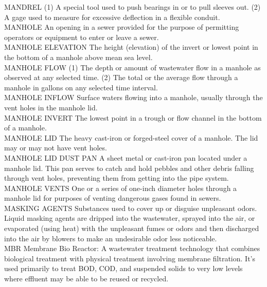 MANDREL
(1) A special tool used to push bearings in or to pull sleeves out. (2) A gage used to measure for excessive deflection in a flexible conduit. 
\vspace{0.3cm}\\
MANHOLE
An opening in a sewer provided for the purpose of permitting operators or equipment to enter or leave a sewer. 
\vspace{0.3cm}\\
MANHOLE ELEVATION
The height (elevation) of the invert or lowest point in the bottom of a manhole above mean sea level. 
\vspace{0.3cm}\\
MANHOLE FLOW
(1) The depth or amount of wastewater flow in a manhole as observed at any selected time. (2) The total or the average flow through a manhole in gallons on any selected time interval.
\vspace{0.3cm}\\
MANHOLE INFLOW
Surface waters flowing into a manhole, usually through the vent holes in the manhole lid. 
\vspace{0.3cm}\\
MANHOLE INVERT
The lowest point in a trough or flow channel in the bottom of a manhole. 
\vspace{0.3cm}\\
MANHOLE LID
The heavy cast-iron or forged-steel cover of a manhole. The lid may or may not have vent holes. 
\vspace{0.3cm}\\
MANHOLE LID DUST PAN
A sheet metal or cast-iron pan located under a manhole lid. This pan serves to catch and hold pebbles and other debris falling through vent holes, preventing them from getting into the pipe system. 
\vspace{0.3cm}\\
MANHOLE VENTS
One or a series of one-inch diameter holes through a manhole lid for purposes of venting dangerous gases found in sewers. 
\vspace{0.3cm}\\
MASKING AGENTS
Substances used to cover up or disguise unpleasant odors. Liquid masking agents are dripped into the wastewater, sprayed into the air, or evaporated (using heat) with the unpleasant fumes or odors and then discharged into the air by blowers to make an undesirable odor less noticeable.
\vspace{0.3cm}\\
MBR
Membrane Bio Reactor:  A wastewater treatment technology that combines biological treatment with physical treatment involving membrane filtration. It’s used primarily to treat BOD, COD, and suspended solids to very low levels where effluent may be able to be reused or recycled.
